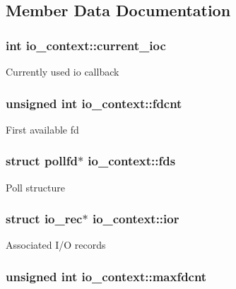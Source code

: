 \subsection{Member Data Documentation}
\hypertarget{structio__context_ac9a730f2bc91e9c3e76bf1f39a486dde}{
\subsubsection[{current\_\-ioc}]{\setlength{\rightskip}{0pt plus 5cm}int {\bf io\_\-context::current\_\-ioc}}}
\label{structio__context_ac9a730f2bc91e9c3e76bf1f39a486dde}
Currently used io callback \hypertarget{structio__context_ad784e26b7cd7e03761d0846362748ef4}{
\subsubsection[{fdcnt}]{\setlength{\rightskip}{0pt plus 5cm}unsigned int {\bf io\_\-context::fdcnt}}}
\label{structio__context_ad784e26b7cd7e03761d0846362748ef4}
First available fd \hypertarget{structio__context_aa63a2d3e2dc319d7abf5135fbcc69678}{
\subsubsection[{fds}]{\setlength{\rightskip}{0pt plus 5cm}struct pollfd$\ast$ {\bf io\_\-context::fds}}}
\label{structio__context_aa63a2d3e2dc319d7abf5135fbcc69678}
Poll structure \hypertarget{structio__context_a9738fcd9c2a5ab1eda8f386c5e4e3503}{
\subsubsection[{ior}]{\setlength{\rightskip}{0pt plus 5cm}struct {\bf io\_\-rec}$\ast$ {\bf io\_\-context::ior}}}
\label{structio__context_a9738fcd9c2a5ab1eda8f386c5e4e3503}
Associated I/O records \hypertarget{structio__context_af59f406dc073350e6babc8eddd4e0872}{
\subsubsection[{maxfdcnt}]{\setlength{\rightskip}{0pt plus 5cm}unsigned int {\bf io\_\-context::maxfdcnt}}}
